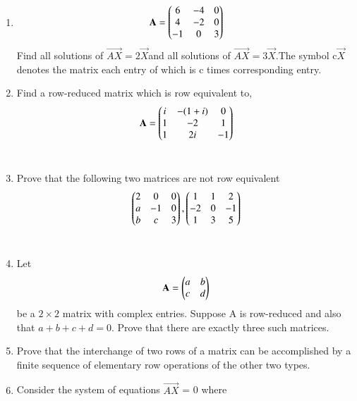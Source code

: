 \renewcommand{\theequation}{\theenumi}
\renewcommand{\thefigure}{\theenumi}
\begin{enumerate}[label=\thesubsection.\arabic*.,ref=\thesubsection.\theenumi]
%
\item 
\begin{align}
\mathbf{A}=
       \begin{pmatrix}6 &-4 & 0\\
             4& -2 & 0\\
             -1 &0 &3\end{pmatrix}
\end{align}\noindent
Find all solutions of $\vec{AX}=2\vec{X}$and all solutions of $\vec{AX}=3\vec{X}$.The symbol c$\vec{X}$ denotes the matrix each entry of which is c times corresponding entry.
\\
\solution

%
\item Find a row-reduced matrix which is row equivalent to,
\begin{align}
\mathbf{A} = \begin{pmatrix}i&-(1+i)&0\\1&-2&1\\1&2i&-1\end{pmatrix}
\label{eq:solutions/1/2/4/A}
\end{align}
\\
\solution

\item Prove that the following two matrices are not row equivalent 
\begin{align}
    \begin{pmatrix}2&0&0\\a&-1&0\\b&c&3\end{pmatrix}, \begin{pmatrix}1&1&2\\-2&0&-1\\1&3&5\end{pmatrix}
\end{align}
\\
\solution

\item Let
\begin{align}
    \mathbf{A}=\begin{pmatrix}a & b\\c & d\end{pmatrix}
\end{align}
be a $2\times2$ matrix with complex entries. Suppose A is row-reduced and also that $a+b+c+d=0$. Prove that there are exactly three such matrices. 
\\
\solution

\item Prove that the interchange of two rows of a matrix can be accomplished by a finite sequence of elementary row operations of the other two types.
\\
\solution

%
\item Consider the system of equations $\vec{AX}$ = 0 where

\end{enumerate}
